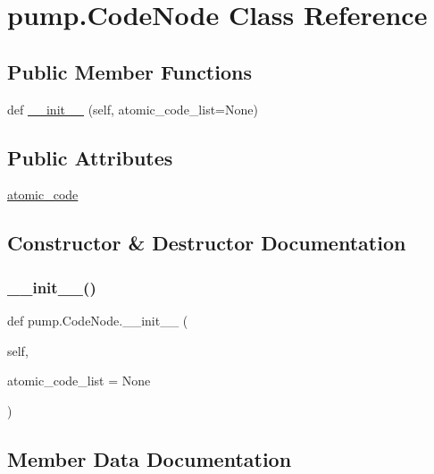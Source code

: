 \hypertarget{classpump_1_1_code_node}{}\section{pump.\+Code\+Node Class Reference}
\label{classpump_1_1_code_node}
\subsection*{Public Member Functions}
\begin{DoxyCompactItemize}
\item 
def \mbox{\hyperlink{classpump_1_1_code_node_a2ca8a75324a64e48004812d6c0bc1cbd}{\+\_\+\+\_\+init\+\_\+\+\_\+}} (self, atomic\+\_\+code\+\_\+list=None)
\end{DoxyCompactItemize}
\subsection*{Public Attributes}
\begin{DoxyCompactItemize}
\item 
\mbox{\hyperlink{classpump_1_1_code_node_ac7251110cc987c709e0e17d95521993e}{atomic\+\_\+code}}
\end{DoxyCompactItemize}


\subsection{Constructor \& Destructor Documentation}
\mbox{\label{classpump_1_1_code_node_a2ca8a75324a64e48004812d6c0bc1cbd}} 
\subsubsection{\texorpdfstring{\_\_init\_\_()}{\_\_init\_\_()}}
{\footnotesize\ttfamily def pump.\+Code\+Node.\+\_\+\+\_\+init\+\_\+\+\_\+ (\begin{DoxyParamCaption}\item[{}]{self,  }\item[{}]{atomic\+\_\+code\+\_\+list = {\ttfamily None} }\end{DoxyParamCaption})}



\subsection{Member Data Documentation}
\mbox{\label{classpump_1_1_code_node_ac7251110cc987c709e0e17d95521993e}} 
